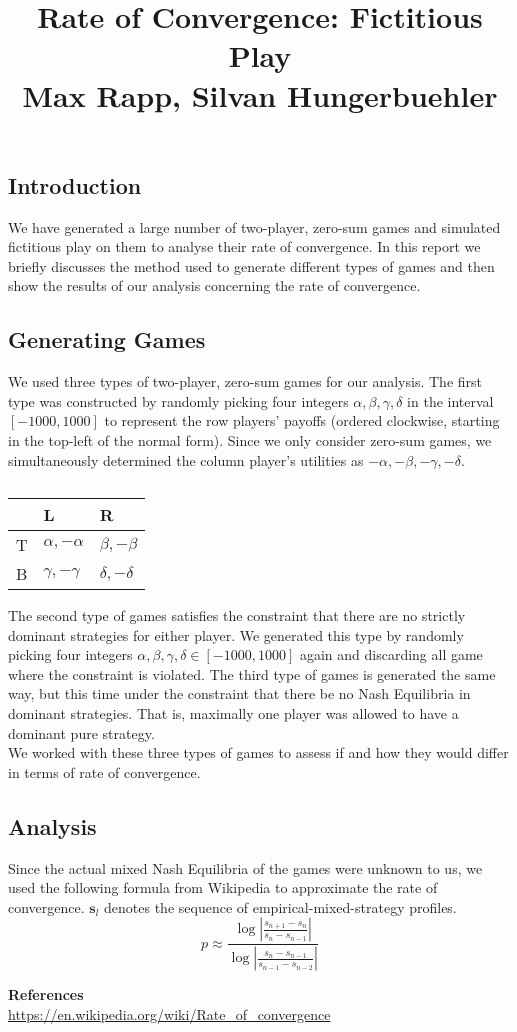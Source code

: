 \documentclass[10pt,a4paper]{article}
\title{%
  Rate of Convergence: Fictitious Play \\
  \large Max Rapp, Silvan Hungerbuehler}
\date{}
\begin{document}
\maketitle

\subsection*{Introduction}
We have generated a large number of two-player, zero-sum games and simulated fictitious play on them to analyse their rate of convergence. 
In this report we briefly discusses the method used to generate different types of games and then show the results of our analysis concerning the rate of convergence.
\subsection*{Generating Games}
We used three types of two-player, zero-sum games for our analysis. The first type was constructed by randomly picking four integers  $\alpha,\beta,\gamma,\delta$ in the interval $[-1000,1000]$ to represent the row players' payoffs (ordered clockwise, starting in the top-left of the normal form). Since we only consider zero-sum games, we simultaneously determined the column player's utilities as $-\alpha,-\beta,-\gamma,-\delta$.
\begin{table}[h]
\centering
\caption{}
\begin{tabular}{|l|l|l|}
\hline
  & L                & R                \\ \hline
T & $\alpha,-\alpha$ & $\beta,-\beta$   \\ \hline
B & $\gamma,-\gamma$ & $\delta,-\delta$ \\ \hline
\end{tabular}
\end{table}

The second type of games satisfies the constraint that there are no strictly dominant strategies for either player. We generated this type by randomly picking four integers $\alpha,\beta,\gamma,\delta \in [-1000,1000]$ again and discarding all game where the constraint is violated. The third type of games is generated the same way, but this time under the constraint that there be no Nash Equilibria in dominant strategies. That is, maximally one player was allowed to have a dominant pure strategy.\\
We worked with these three types of games to assess if and how they would differ in terms of rate of convergence.
\subsection*{Analysis}
Since the actual mixed Nash Equilibria of the games were unknown to us, we used the following formula from Wikipedia to approximate the rate of convergence. $\boldsymbol{s}_l$ denotes the sequence of empirical-mixed-strategy profiles.
\begin{equation*}
p\approx\frac{\log{|\frac{s_{n+1}-s_{n}}{s_{n}-s_{n-1}}|}}{\log{|\frac{s_{n}-s_{n-1}}{s_{n-1}-s_{n-2}}|}}
\end{equation*}

\textbf{References}\\
\url{https://en.wikipedia.org/wiki/Rate_of_convergence}
\end{document}

